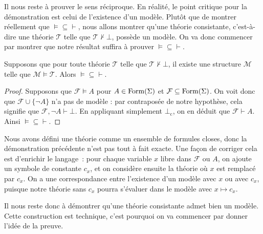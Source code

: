 Il nous reste à prouver le sens réciproque. En réalité, le point critique pour
la démonstration est celui de l'existence d'un modèle. Plutôt que de montrer
réellement que $\vDash\subseteq\vdash$, nous allons montrer qu'une théorie
consistante, c'est-à-dire une théorie $\mathcal T$ telle que
$\mathcal T\nvdash \bot$, possède un modèle. On va donc commencer par montrer
que notre résultat suffira à prouver $\vDash\subseteq\vdash$.

\begin{lemma}
  Supposons que pour toute théorie $\mathcal T$ telle que
  $\mathcal T\nvdash\bot$, il existe une structure $\mathcal M$ telle que
  $\mathcal M\models \mathcal T$. Alors $\vDash\subseteq\vdash$.
\end{lemma}

\begin{proof}
  Supposons que $\mathcal F\vDash A$ pour $A\in\operatorname{Form}(\Sigma)$ et
  $\mathcal F\subseteq\operatorname{Form}(\Sigma)$. On voit donc que
  $\mathcal F\cup\{\lnot A\}$ n'a pas de modèle : par contraposée de notre
  hypothèse, cela signifie que $\mathcal F,\lnot A\vdash \bot$. En appliquant
  simplement $\bot_\mathrm c$, on en déduit que $\mathcal F\vdash A$. Ainsi
  $\vDash\subseteq\vdash$.
\end{proof}

\begin{remark}
  Nous avons défini une théorie comme un ensemble de formules closes, donc la
  démonstration précédente n'est pas tout à fait exacte. Une façon de corriger
  cela est d'enrichir le langage~: pour chaque variable $x$ libre dans
  $\mathcal F$ ou $A$, on ajoute un symbole de constante $c_x$, et on considère
  ensuite la théorie où $x$ est remplacé par $c_x$. On a une correspondance
  entre l'existence d'un modèle avec $x$ ou avec $c_x$, puisque notre théorie
  sans $c_x$ pourra s'évaluer dans le modèle avec $x\mapsto c_x$.
\end{remark}

Il nous reste donc à démontrer qu'une théorie consistante admet bien un modèle.
Cette construction est technique, c'est pourquoi on va commencer par donner
l'idée de la preuve.

